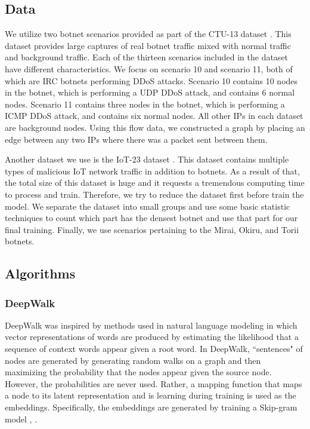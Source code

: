 \documentclass[10pt]{article}
\begin{document}
\begin{multicols}{2}
\subsection{Data}
We utilize two botnet scenarios provided as part of the CTU-13 dataset \cite{Garcia}. This dataset provides large captures of real botnet traffic mixed with normal traffic and background traffic. Each of the thirteen scenarios included in the dataset have different characteristics. We focus on scenario 10 and scenario 11, both of which are IRC botnets performing DDoS attacks. Scenario 10 contains 10 nodes in the botnet, which is performing a UDP DDoS attack, and contains 6 normal nodes. Scenario 11 contains three nodes in the botnet, which is performing a ICMP DDoS attack, and contains six normal nodes. All other IPs in each dataset are background nodes. Using this flow data, we constructed a graph by placing an edge between any two IPs where there was a packet sent between them. 

Another dataset we use is the IoT-23 dataset \cite{IoT-23}. This dataset contains multiple types of malicious IoT network traffic in addition to botnets. As a result of that, the total size of this dataset is huge and it requests a tremendous computing time to process and train. Therefore, we try to reduce the dataset first before train the model. We separate the dataset into small groups and use some basic statistic techniques to count which part has the densest botnet and use that part for our final training. Finally, we use scenarios pertaining to the Mirai, Okiru, and Torii botnets. 

\subsection{Algorithms}
 \subsubsection{DeepWalk}
DeepWalk \cite{Perozzi} was inspired by methods used in natural language modeling in which vector representations of words are produced by estimating the likelihood that a sequence of context words appear given a root word. In DeepWalk, ``sentences" of nodes are generated by generating random walks on a graph and then maximizing the probability that the nodes appear given the source node. However, the probabilities are never used. Rather, a mapping function that maps a node to its latent representation and is learning during training is used as the embeddings. Specifically, the embeddings are generated by training a Skip-gram model \cite{Mikolov}, \cite{Perozzi}.


\end{multicols}
\end{document}
